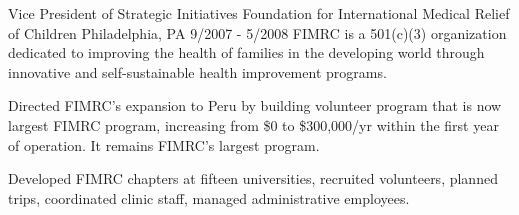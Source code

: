   \cvexperience
    {Vice President of Strategic Initiatives}
    {Foundation for International Medical Relief of Children}
    {Philadelphia, PA}
    {9/2007 - 5/2008}
    {FIMRC is a 501(c)(3) organization dedicated to improving the health of families in the developing world through innovative and self-sustainable health improvement programs.}
    {
      \begin{cvitems}
              \item {Directed FIMRC's expansion to Peru by building volunteer program that is now largest FIMRC program, increasing from \$0 to \$300,000/yr  within the first year of operation. It remains FIMRC's largest program.}
               \item {Developed FIMRC chapters at fifteen universities, recruited volunteers, planned trips, coordinated clinic staff, managed administrative employees.}
             \end{cvitems}
    }